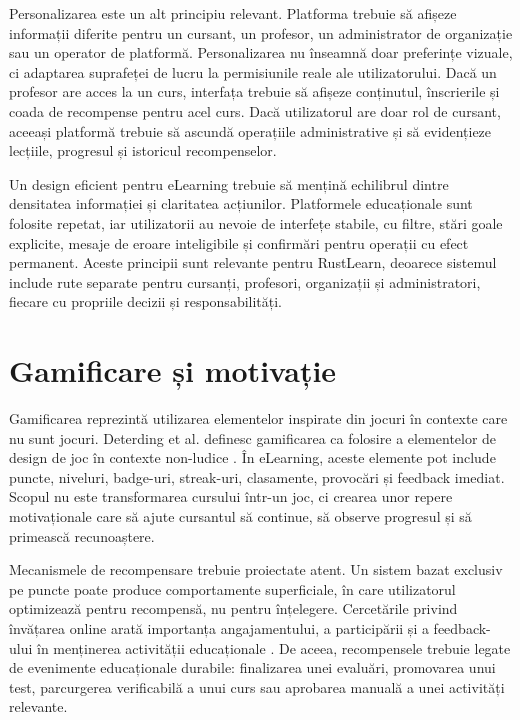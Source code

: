 Personalizarea este un alt principiu relevant. Platforma trebuie să afișeze informații diferite pentru un cursant, un profesor, un administrator de organizație sau un operator de platformă. Personalizarea nu înseamnă doar preferințe vizuale, ci adaptarea suprafeței de lucru la permisiunile reale ale utilizatorului. Dacă un profesor are acces la un curs, interfața trebuie să afișeze conținutul, înscrierile și coada de recompense pentru acel curs. Dacă utilizatorul are doar rol de cursant, aceeași platformă trebuie să ascundă operațiile administrative și să evidențieze lecțiile, progresul și istoricul recompenselor.

Un design eficient pentru eLearning trebuie să mențină echilibrul dintre densitatea informației și claritatea acțiunilor. Platformele educaționale sunt folosite repetat, iar utilizatorii au nevoie de interfețe stabile, cu filtre, stări goale explicite, mesaje de eroare inteligibile și confirmări pentru operații cu efect permanent. Aceste principii sunt relevante pentru RustLearn, deoarece sistemul include rute separate pentru cursanți, profesori, organizații și administratori, fiecare cu propriile decizii și responsabilități.

\section{Gamificare și motivație}
Gamificarea reprezintă utilizarea elementelor inspirate din jocuri în contexte care nu sunt jocuri. Deterding et al. definesc gamificarea ca folosire a elementelor de design de joc în contexte non-ludice \cite{deterding2011}. În eLearning, aceste elemente pot include puncte, niveluri, badge-uri, streak-uri, clasamente, provocări și feedback imediat. Scopul nu este transformarea cursului într-un joc, ci crearea unor repere motivaționale care să ajute cursantul să continue, să observe progresul și să primească recunoaștere.

Mecanismele de recompensare trebuie proiectate atent. Un sistem bazat exclusiv pe puncte poate produce comportamente superficiale, în care utilizatorul optimizează pentru recompensă, nu pentru înțelegere. Cercetările privind învățarea online arată importanța angajamentului, a participării și a feedback-ului în menținerea activității educaționale \cite{paans2018,martin2018engagement,hrastinski2009diversity}. De aceea, recompensele trebuie legate de evenimente educaționale durabile: finalizarea unei evaluări, promovarea unui test, parcurgerea verificabilă a unui curs sau aprobarea manuală a unei activități relevante.

